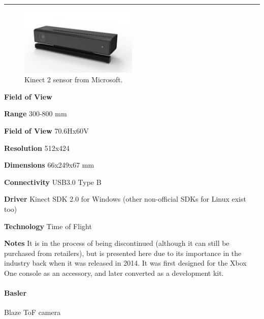 \documentclass[../main.tex]{subfiles}
\begin{document}
\noindent\rule{8cm}{0.1pt}
\begin{figure}[H]
    \centering
    \includegraphics[width=0.5\textwidth]{images/kinect2.jpg}
    \caption{Kinect 2 sensor from Microsoft.}
    \label{fig:kinect2}
\end{figure}
\begin{labeling}{\textbf{Field of View    }}
    \setlength{\itemindent}{2em}
    \item [\textbf{Range}] 300-800 mm 
    \item [\textbf{Field of View}] 70.6Hx60V
    \item [\textbf{Resolution}] 512x424
    \item [\textbf{Dimensions}] 66x249x67 mm
    \item [\textbf{Connectivity}] USB3.0 Type B
    \item [\textbf{Driver}] Kinect SDK 2.0 for Windows (other non-official SDKs for Linux exist too)
    \item [\textbf{Technology}] Time of Flight
    \item [\textbf{Notes}] It is in the process of being discontinued (although it can still be purchased from retailers), but is presented here due to its importance in the industry back when it was released in 2014. It was first designed for the Xbox One console as an accessory, and later converted as a development kit.
\end{labeling}
\vspace{1em}
\paragraph{\large \textbf{Basler}} {\large Blaze ToF camera}
\end{document}
